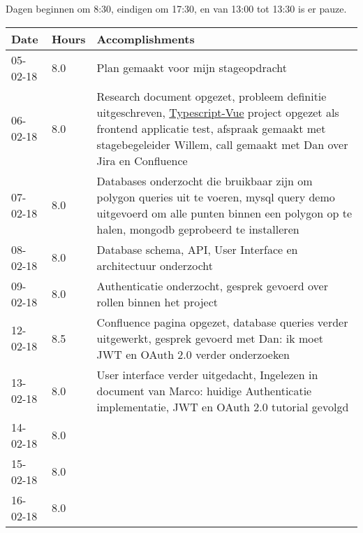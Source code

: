 Dagen beginnen om 8:30, eindigen om 17:30, en van 13:00 tot 13:30 is er pauze.
\begin{center}
    \begin{tabular}{ | l | l | p{9cm} |}
    \hline
    Date & Hours & Accomplishments \\ \hline
    \hline

    05-02-18 & 8.0 & Plan gemaakt voor mijn stageopdracht \\ \hline
    06-02-18 & 8.0 & Research document opgezet, probleem definitie uitgeschreven, \href{https://github.com/Menziess/Typescript-Vue-Template}{Typescript-Vue} project opgezet als frontend applicatie test, afspraak gemaakt met stagebegeleider Willem, call gemaakt met Dan over Jira en Confluence \\ \hline
    07-02-18 & 8.0 & Databases onderzocht die bruikbaar zijn om polygon queries uit te voeren, mysql query demo uitgevoerd om alle punten binnen een polygon op te halen, mongodb geprobeerd te installeren \\ \hline
    08-02-18 & 8.0 & Database schema, API, User Interface en architectuur onderzocht \\ \hline
    09-02-18 & 8.0 & Authenticatie onderzocht, gesprek gevoerd over rollen binnen het project  \\ \hline
    \hline

    12-02-18 & 8.5 & Confluence pagina opgezet, database queries verder uitgewerkt, gesprek gevoerd met Dan: ik moet JWT en OAuth 2.0 verder onderzoeken \\ \hline
    13-02-18 & 8.0 & User interface verder uitgedacht, Ingelezen in document van Marco: huidige Authenticatie implementatie, JWT en OAuth 2.0 tutorial gevolgd  \\ \hline
    14-02-18 & 8.0 &  \\ \hline
    15-02-18 & 8.0 &  \\ \hline
    16-02-18 & 8.0 &  \\ \hline


    \hline
    \end{tabular}
\end{center}